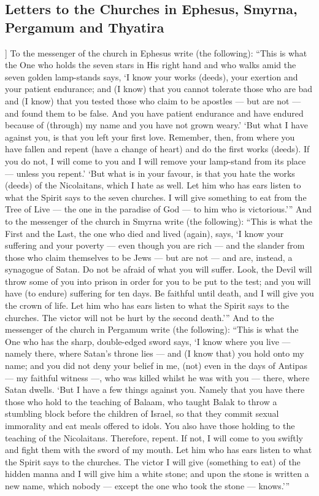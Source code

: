 \begin{pages}
\begin{Leftside}
        			\chapter{Letters to the Churches in Ephesus, Smyrna, Pergamum and Thyatira}
				]
			To the messenger of the church in Ephesus write (the following): “This is what the One who holds the seven stars in His right hand and who walks amid the seven golden lamp-stands says, ‘I know your works (deeds), your exertion and your patient endurance; and (I know) that you cannot tolerate those who are bad and (I know) that you tested those who claim to be apostles — but are not — and found them to be false. And you have patient endurance and have endured because of (through) my name and you have not grown weary.’ 
		\pend
		\pstart
			‘But what I have against you, is that you left your first love. Remember, then, from where you have fallen and repent (have a change of heart) and do the first works (deeds). If you do not, I will come to you and I will remove your lamp-stand from its place — unless you repent.’
		\pend
		\pstart
			‘But what is in your favour, is that you hate the works (deeds) of the Nicolaitans, which I hate as well. Let him who has ears listen to what the Spirit says to the seven churches. I will give something to eat from the Tree of Live — the one in the paradise of God — to him who is victorious.’”
		\pend
		\pstart
			And to the messenger of the church in Smyrna write (the following): “This is what the First and the Last, the one who died and lived (again), says, ‘I know your suffering and your poverty — even though you are rich — and the slander from those who claim themselves to be Jews — but are not — and are, instead, a synagogue of Satan. Do not be afraid of what you will suffer. Look, the Devil will throw some of you into prison in order for you to be put to the test; and you will have (to endure) suffering for ten days. Be faithful until death, and I will give you the crown of life. Let him who has ears listen to what the Spirit says to the churches. The victor will not be hurt by the second death.’”
		\pend
		\pstart
			And to the messenger of the church in Pergamum write (the following): “This is what the One who has the sharp, double-edged sword says, ‘I know where you live — namely there, where Satan’s throne lies — and (I know that) you hold onto my name; and you did not deny your belief in me, (not) even in the days of Antipas — my faithful witness —, who was killed whilst he was with you — there, where Satan dwells.
		\pend
		\pstart
			‘But I have a few things against you. Namely that you have there those who hold to the teaching of Balaam, who taught Balak to throw a stumbling block before the children of Israel, so that they commit sexual immorality and eat meals offered to idols. You also have those holding to the teaching of the Nicolaitans. Therefore, repent. If not, I will come to you swiftly and fight them with the sword of my mouth. Let him who has ears listen to what the Spirit says to the churches. The victor I will give (something to eat) of the hidden manna and I will give him a white stone; and upon the stone is written a new name, which nobody — except the one who took the stone — knows.’”

\end{Leftside}
\end{pages}

